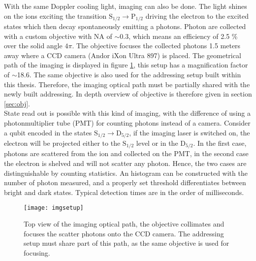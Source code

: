 With the same Doppler cooling light, imaging can also be done. The light shines on the ions exciting the transition $\text{S}_{1/2} \to \text{P}_{1/2}$ driving the electron to the excited states which then decay spontaneously emitting a photons. Photon are collected with a custom objective with NA of $\sim 0.3$, which means an efficiency of 2.5 \% over the solid angle $4\pi$. The objective focuses the collected photons 1.5 meters away where a CCD camera (Andor iXon Ultra 897) is placed. The geometrical path of the imaging is displayed in figure \ref{imgsetup}, this setup has a magnification factor of $\sim$18.6. The same objective is also used for the addressing setup built within this thesis. Therefore, the imaging optical path must be partially shared with the newly built addressing. In depth overview of objective is therefore given in section \ref{sec:obj}.\\
State read out is possible with this kind of imaging, with the difference of using a photonmultiplier tube (PMT) for counting photons instead of a camera. Consider a qubit encoded in the states $\text{S}_{1/2} \to \text{D}_{5/2}$, if the imaging laser is switched on, the electron will be projected either to the $\text{S}_{1/2}$ level or in the $\text{D}_{5/2} $. In the first case, photons are scattered from the ion and collected on the PMT, in the second case the electron is shelved and will not scatter any photon. Hence, the two cases are distinguishable by counting statistics. An histogram can be constructed  with the number of photon measured, and a properly set threshold differentiates between bright and dark states. Typical detection times are in the order of milliseconds.

\begin{figure}
\centering
\texttt{[image: imgsetup]}
\caption{Top view of the imaging optical path, the objective collimates and focuses the scatter photons onto the CCD camera. The addressing setup must share part of this path, as the same objective is used for focusing.}
\label{imgsetup}
\end{figure}

